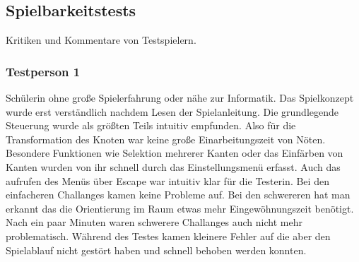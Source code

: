 %



\newpage



\label{Abschnitt:Tests:Protokoll:Abnahme}



\subsection*{Spielbarkeitstests}

Kritiken und Kommentare von Testspielern.

\subsubsection*{Testperson 1}
Schülerin ohne große Spielerfahrung oder nähe zur Informatik. Das Spielkonzept wurde erst verständlich nachdem Lesen der Spielanleitung. Die grundlegende Steuerung wurde als größten Teils intuitiv empfunden. Also für die Transformation des Knoten war keine große Einarbeitungszeit von Nöten. Besondere Funktionen wie Selektion mehrerer Kanten oder das Einfärben von Kanten wurden von ihr schnell durch das Einstellungsmenü erfasst. Auch das aufrufen des Menüs über Escape war intuitiv klar für die Testerin. Bei den einfacheren Challanges kamen keine Probleme auf. Bei den schwereren hat man erkannt das die Orientierung im Raum etwas mehr Eingewöhnungszeit benötigt. Nach ein paar Minuten waren schwerere Challanges auch nicht mehr problematisch. Während des Testes kamen kleinere Fehler auf die aber den Spielablauf nicht gestört haben und schnell behoben werden konnten.





